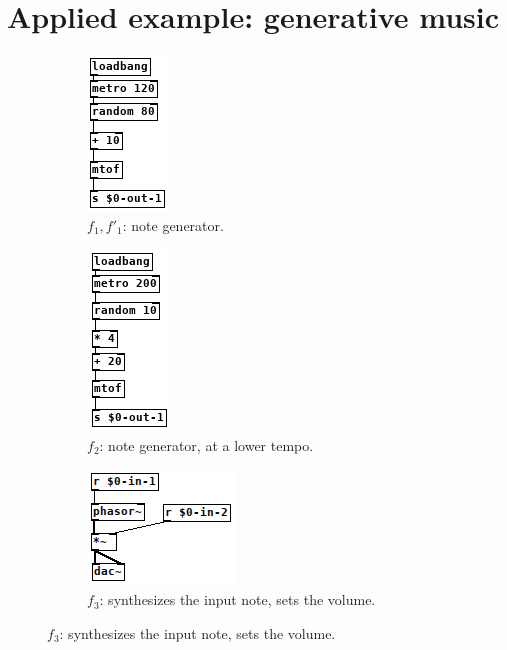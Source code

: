 \documentclass{article}
\begin{document}
\section{Applied example: generative music}
\begin{figure}[h]
    \centering
    \begin{subfigure}{0.21\textwidth}\centering
        \includegraphics[scale=0.5]{images/pd-1.png}
        \caption{$f_1, f'_1$: note generator.}
    \end{subfigure}
    \begin{subfigure}{0.21\textwidth}\centering
        \includegraphics[scale=0.5]{images/pd-2.png}
        \caption{$f_2$: note generator, at a lower tempo.}
    \end{subfigure}
    
    \begin{subfigure}{0.21\textwidth}\centering
        \includegraphics[scale=0.5]{images/pd-3.png}
        \caption{$f_3$: synthesizes the input note, sets the volume.}
    \end{subfigure}


\end{figure}
\end{document}
